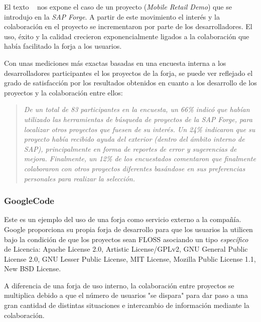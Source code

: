 \par El texto ~\cite{open-collaboration-forges} nos expone el caso de un proyecto (\emph{Mobile Retail Demo}) que se introdujo en la \emph{SAP Forge}. A partir de este movimiento el interés y la colaboración en el proyecto se incrementaron por parte de los desarrolladores. El uso, éxito y la calidad crecieron exponencialmente ligados a la colaboración que había facilitado la forja a los usuarios.

\par Con unas mediciones más exactas basadas en una encuesta interna a los desarrolladores participantes el los proyectos de la forja, se puede ver reflejado el grado de satisfacción por los resultados obtenidos en cuanto a los desarrollo de los proyectos y la colaboración entre ellos:

\begin{quotation}
    \emph{De un total de 83 participantes en la encuesta, un 66\% indicó que habían utilizado las herramientas de búsqueda de proyectos de la \emph{SAP Forge}, para localizar otros proyectos que fuesen de su interés. Un 24\% indicaron que su proyecto había recibido ayuda del exterior (dentro del ámbito interno de SAP), principalmente en forma de reportes de error y sugerencias de mejora. Finalmente, un 12\% de los encuestados comentaron que finalmente colaboraron con otros proyectos diferentes basándose en sus preferencias personales para realizar la selección.}
\end{quotation}

\subsubsection{GoogleCode}
\label{subsub:googlecode}

\par Este es un ejemplo del uso de una forja como servicio externo a la compañía. Google proporciona su propia forja de desarrollo para que los usuarios la utilicen bajo la condición de que los proyectos sean FLOSS asociando un tipo \emph{específico} de Licencia: Apache License 2.0, Artistic License/GPLv2, GNU General Public License 2.0, GNU Lesser Public License, MIT License, Mozilla Public License 1.1, New BSD License.

\par A diferencia de una forja de uso interno, la colaboración entre proyectos se multiplica debido a que el número de usuarios "se dispara" para dar paso a una gran cantidad de distintas situaciones e intercambio de información mediante la colaboración.

